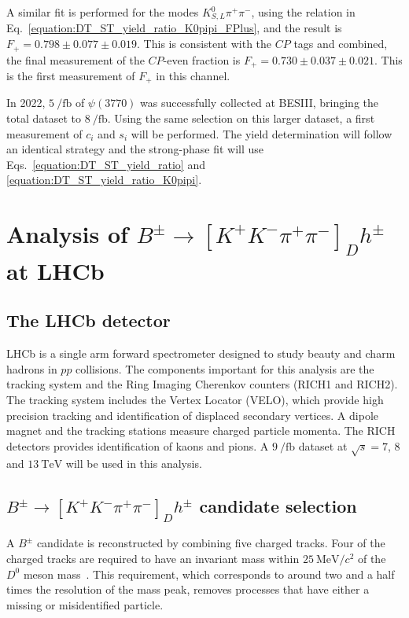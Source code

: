 \documentclass[12pt, a4paper, notitlepage, onecolumn]{article}
\begin{document}
A similar fit is performed for the modes $K^0_{S, L}\pi^+\pi^-$, using the relation in Eq.~\eqref{equation:DT_ST_yield_ratio_K0pipi_FPlus}, and the result is $F_+ = 0.798 \pm 0.077 \pm 0.019$. This is consistent with the $C\!P$ tags and combined, the final measurement of the $C\!P$-even fraction is $F_+ = 0.730 \pm 0.037 \pm 0.021$. This is the first measurement of $F_+$ in this channel.

In 2022, $\SI{5}{\per\femto\barn}$ of $\psi(3770)$ was successfully collected at BESIII, bringing the total dataset to $\SI{8}{\per\femto\barn}$. Using the same selection on this larger dataset, a first measurement of $c_i$ and $s_i$ will be performed. The yield determination will follow an identical strategy and the strong-phase fit will use Eqs.~\eqref{equation:DT_ST_yield_ratio} and \eqref{equation:DT_ST_yield_ratio_K0pipi}.

\section{Analysis of \texorpdfstring{$B^\pm\to[K^+K^-\pi^+\pi^-]_Dh^\pm$}{B2DhD2KKpipi} at LHCb}
\subsection{The LHCb detector}
\noindent LHCb \cite{LHCb-DP-2008-001} is a single arm forward spectrometer designed to study beauty and charm hadrons in $pp$ collisions. The components important for this analysis are the tracking system and the Ring Imaging Cherenkov counters (RICH1 and RICH2). The tracking system includes the Vertex Locator (VELO), which provide high precision tracking and identification of displaced secondary vertices. A dipole magnet and the tracking stations measure charged particle momenta. The RICH detectors provides identification of kaons and pions. A $\SI{9}{\per\femto\barn}$ dataset at $\sqrt{s} = 7$, $8$ and $\SI{13}{\tera\eV}$ will be used in this analysis.

\subsection{\texorpdfstring{$B^\pm\to[K^+K^-\pi^+\pi^-]_Dh^\pm$}{B2DhD2KKpipi} candidate selection}
\label{section:Candidate_selection}
\noindent A $B^\pm$ candidate is reconstructed by combining five charged tracks. Four of the charged tracks are required to have an invariant mass within $\SI{25}{\mega\eV/c^2}$ of the $D^0$ meson mass~\cite{pdg}. This requirement, which corresponds to around two and a half times the resolution of the mass peak, removes processes that have either a missing or misidentified particle.
\end{document}
